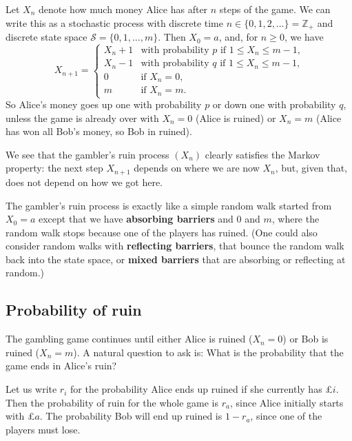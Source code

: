 \documentclass[
  a4paper,
]{article}
\theoremstyle{definition}
\theoremstyle{definition}
\theoremstyle{definition}
\theoremstyle{remark}
\begin{document}
Let \(X_n\) denote how much money Alice has after \(n\) steps of the game. We can write this as a stochastic process with discrete time \(n \in \{0,1,2,\dots\} = \mathbb Z_+\) and discrete state space \(\mathcal S = \{0,1,\dots,m\}\). Then \(X_0 = a\), and, for \(n \geq 0\), we have
\[ X_{n+1} = \begin{cases} X_n + 1 & \text{with probability $p$ if $1\leq X_n \leq m-1$,} \\
                           X_n - 1 & \text{with probability $q$ if $1\leq X_n \leq m-1$,} \\
                           0       & \text{if $X_n = 0$,} \\
                           m       & \text{if $X_n = m$.} \end{cases} \]
So Alice's money goes up one with probability \(p\) or down one with probability \(q\), unless the game is already over with \(X_n = 0\) (Alice is ruined) or \(X_n = m\) (Alice has won all Bob's money, so Bob in ruined).

We see that the gambler's ruin process \((X_n)\) clearly satisfies the Markov property: the next step \(X_{n+1}\) depends on where we are now \(X_n\), but, given that, does not depend on how we got here.

The gambler's ruin process is exactly like a simple random walk started from \(X_0 = a\) except that we have \textbf{absorbing barriers} and \(0\) and \(m\), where the random walk stops because one of the players has ruined. (One could also consider random walks with \textbf{reflecting barriers}, that bounce the random walk back into the state space, or \textbf{mixed barriers} that are absorbing or reflecting at random.)

\hypertarget{ruin-probability}{%
\subsection{Probability of ruin}\label{ruin-probability}}

The gambling game continues until either Alice is ruined (\(X_n = 0\)) or Bob is ruined (\(X_n = m\)). A natural question to ask is: What is the probability that the game ends in Alice's ruin?

Let us write \(r_i\) for the probability Alice ends up ruined if she currently has £\(i\). Then the probability of ruin for the whole game is \(r_a\), since Alice initially starts with £\(a\). The probability Bob will end up ruined is \(1 - r_a\), since one of the players must lose.
\end{document}
